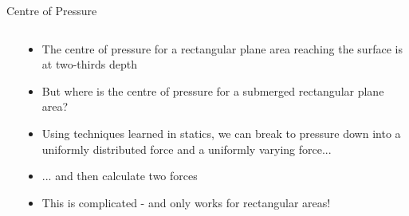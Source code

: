 \documentclass[9pt,xcolor={svgnames, x11names},professionalfonts, mathserif]{beamer}
\begin{document}
    
    
    
    
    \begin{frame}{Centre of Pressure}
     \begin{columns}
      \begin{column}{0.45\textwidth}
      \end{column}
      \begin{column}{0.5\textwidth}
       \begin{itemize}
        \item The centre of pressure for a rectangular plane area reaching the surface is at two-thirds depth \pause
        \item But where is the centre of pressure for a submerged rectangular plane area?  \pause
        \item Using techniques learned in statics, we can break to pressure down into a uniformly
              distributed force and a uniformly varying force...  \pause
        \item ... and then calculate two forces \pause
        \item This is complicated - and only works for rectangular areas! \end{itemize}
        \end{column}
        \end{columns}
        
        \end{frame}
        
\end{document}
